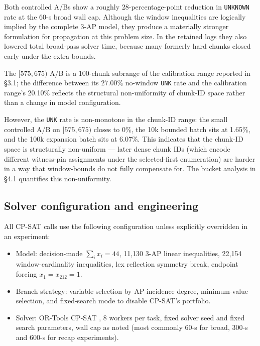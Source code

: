 Both controlled A/Bs show a roughly 28-percentage-point reduction in
\texttt{UNKNOWN} rate at the 60-s broad wall cap. Although the window
inequalities are logically implied by the complete 3-AP model, they produce
a materially stronger formulation for propagation at this problem size. In
the retained logs they also lowered total broad-pass solver time, because many
formerly hard chunks closed early under the extra bounds.

The $[575, 675)$ A/B is a 100-chunk subrange of the calibration range
reported in §3.1; the difference between its 27.00\% no-window \texttt{UNK} rate
and the calibration range's 20.10\% reflects the structural non-uniformity of
chunk-ID space rather than a change in model configuration.

However, the \texttt{UNK} rate is non-monotone in the chunk-ID range: the small
controlled A/B on $[575, 675)$ closes to 0\%, the 10k bounded batch
sits at 1.65\%, and the 100k expansion batch sits at 6.07\%. This
indicates that the chunk-ID space is structurally non-uniform --- later
dense chunk IDs (which encode different witness-pin assignments under the
selected-first enumeration) are harder
in a way that window-bounds do not fully compensate for. The bucket
analysis in §4.1 quantifies this non-uniformity.

\subsection{Solver configuration and engineering}\label{solver-configuration-and-engineering}

All CP-SAT calls use the following configuration unless explicitly
overridden in an experiment:

\begin{itemize}
\tightlist
\item
  Model: decision-mode $\sum_i x_i = 44$, 11,130 3-AP linear
  inequalities, 22,154 window-cardinality inequalities, lex
  reflection symmetry break, endpoint forcing $x_1=x_{212}=1$.
\item
  Branch strategy: variable selection by AP-incidence degree, minimum-value
  selection, and fixed-search mode to disable CP-SAT's portfolio.
\item
  Solver: OR-Tools CP-SAT \cite{or-tools}, 8 workers per task, fixed solver seed
  and fixed search parameters, wall cap as noted (most commonly 60-s
  for broad, 300-s and 600-s for recap experiments).
\end{itemize}

